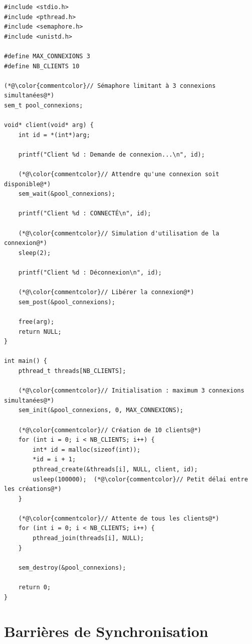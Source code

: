 \documentclass[11pt,a4paper]{article}
\begin{document}
\begin{lstlisting}[caption={Limitation du nombre de connexions simultanées}]
#include <stdio.h>
#include <pthread.h>
#include <semaphore.h>
#include <unistd.h>

#define MAX_CONNEXIONS 3
#define NB_CLIENTS 10

(*@\color{commentcolor}// Sémaphore limitant à 3 connexions simultanées@*)
sem_t pool_connexions;

void* client(void* arg) {
    int id = *(int*)arg;
    
    printf("Client %d : Demande de connexion...\n", id);
    
    (*@\color{commentcolor}// Attendre qu'une connexion soit disponible@*)
    sem_wait(&pool_connexions);
    
    printf("Client %d : CONNECTÉ\n", id);
    
    (*@\color{commentcolor}// Simulation d'utilisation de la connexion@*)
    sleep(2);
    
    printf("Client %d : Déconnexion\n", id);
    
    (*@\color{commentcolor}// Libérer la connexion@*)
    sem_post(&pool_connexions);
    
    free(arg);
    return NULL;
}

int main() {
    pthread_t threads[NB_CLIENTS];
    
    (*@\color{commentcolor}// Initialisation : maximum 3 connexions simultanées@*)
    sem_init(&pool_connexions, 0, MAX_CONNEXIONS);
    
    (*@\color{commentcolor}// Création de 10 clients@*)
    for (int i = 0; i < NB_CLIENTS; i++) {
        int* id = malloc(sizeof(int));
        *id = i + 1;
        pthread_create(&threads[i], NULL, client, id);
        usleep(100000);  (*@\color{commentcolor}// Petit délai entre les créations@*)
    }
    
    (*@\color{commentcolor}// Attente de tous les clients@*)
    for (int i = 0; i < NB_CLIENTS; i++) {
        pthread_join(threads[i], NULL);
    }
    
    sem_destroy(&pool_connexions);
    
    return 0;
}
\end{lstlisting}

\section{Barrières de Synchronisation}
\end{document}
